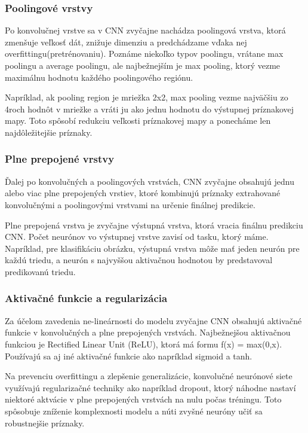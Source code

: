 \subsubsection{Poolingové vrstvy}
\hspace{\parindent} Po konvolučnej vrstve sa v CNN zvyčajne nachádza poolingová vrstva, ktorá zmenšuje veľkosť dát, znižuje dimenziu a predchádzame vďaka nej overfittingu(pretrénovaniu). Poznáme niekoľko typov poolingu, vrátane max poolingu a average poolingu, ale najbežnejším je max pooling, ktorý vezme maximálnu hodnotu každého poolingového regiónu. 

Napríklad, ak pooling region je mriežka 2x2, max pooling vezme najväčšiu zo 4roch hodnôt v mriežke a vráti ju ako jednu hodnotu do výstupnej príznakovej mapy. Toto spôsobí redukciu veľkosti príznakovej mapy a ponecháme len najdôležitejšie príznaky. 

\subsubsection{Plne prepojené vrstvy}
\hspace{\parindent} Ďalej po konvolučných a poolingových vrstvách, CNN zvyčajne obsahujú jednu alebo viac plne prepojených vrstiev, ktoré kombinujú príznaky extrahované konvolučnými a poolingovými vrstvami na určenie finálnej predikcie. 

Plne prepojená vrstva je zvyčajne výstupná vrstva, ktorá vracia finálnu predikciu CNN. Počet neurónov vo výstupnej vrstve zavisí od tasku, ktorý máme. Napríklad, pre klasifikáciu obrázku, výstupná vrstva môže mať jeden neurón pre každú triedu, a neurón s najvyššou aktivačnou hodnotou by predstavoval predikovanú triedu. 

\subsubsection{Aktivačné funkcie a regularizácia}
\hspace{\parindent}Za účelom zavedenia ne-lineárnosti do modelu zvyčajne CNN obsahujú aktivačné funkcie v konvolučných a plne prepojených vrstvách. Najbežnejšou aktivačnou funkciou je Rectified Linear Unit (ReLU), ktorá má formu f(x) = max(0,x). Používajú sa aj iné aktivačné funkcie ako napríklad sigmoid a tanh. 

Na prevenciu overfittingu a zlepšenie generalizácie, konvolučné neurónové siete využívajú regularizačné techniky ako napríklad dropout, ktorý náhodne nastaví niektoré aktvácie v plne prepojených vrstvách na nulu počas tréningu. Toto spôsobuje zníženie komplexnosti modelu a núti zvyšné neuróny učiť sa robustnejšie príznaky. 

